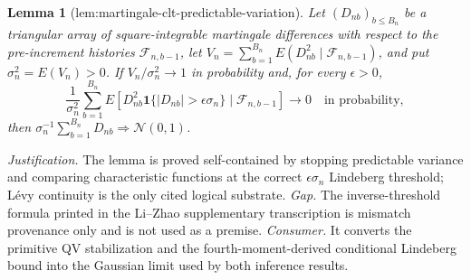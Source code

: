 \documentclass{article}
\newtheorem{lemma}{Lemma}
\begin{document}
\begin{lemma}[lem:martingale-clt-predictable-variation]\label{lem:martingale-clt-predictable-variation}
Let \((D_{nb})_{b\le B_n}\) be a triangular array of square-integrable martingale differences with respect to the pre-increment histories \(\mathcal F_{n,b-1}\), let \(V_n=\sum_{b=1}^{B_n}E(D_{nb}^2\mid\mathcal F_{n,b-1})\), and put \(\sigma_n^2=E(V_n)>0\).  If \(V_n/\sigma_n^2\to1\) in probability and, for every \(\epsilon>0\),
\[
\frac1{\sigma_n^2}\sum_{b=1}^{B_n}E\left[D_{nb}^2\mathbf 1\{|D_{nb}|>\epsilon\sigma_n\}\mid\mathcal F_{n,b-1}\right]\to0
\quad\text{in probability},
\]
then \(\sigma_n^{-1}\sum_{b=1}^{B_n}D_{nb}\Rightarrow\mathcal N(0,1)\).
\end{lemma}
\par\smallskip\noindent \textit{Justification.} The lemma is proved self-contained by stopping predictable variance and comparing characteristic functions at the correct \(\epsilon\sigma_n\) Lindeberg threshold; Lévy continuity is the only cited logical substrate. \textit{Gap.} The inverse-threshold formula printed in the Li--Zhao supplementary transcription is mismatch provenance only and is not used as a premise. \textit{Consumer.} It converts the primitive QV stabilization and the fourth-moment-derived conditional Lindeberg bound into the Gaussian limit used by both inference results.
\end{document}
